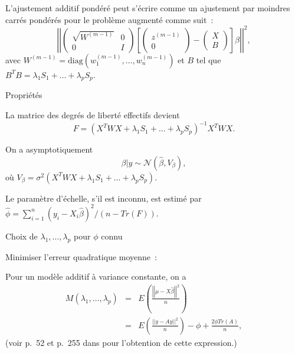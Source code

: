 \documentclass{BeamerTemplate}
\begin{document}
\begin{refsection}
\begin{frame}{}
L'ajustement additif pondéré peut s'écrire comme un ajustement par moindres carrés pondérés pour le problème augmenté comme suit~:
$$\left|\left|
\left(\begin{array}{cc}
\sqrt{W^{(m-1)}} & 0 \\
0 & I 
\end{array} \right) 
\left[
\left(\begin{array}{c}
z^{(m-1)} \\
0
\end{array} \right) -
\left(\begin{array}{c}
X \\
B
\end{array} \right) \right]\beta
\right|\right|^2,
$$
avec $W^{(m-1)} = \mbox{diag}(w_1^{(m-1)}, \ldots,w_n^{(m-1)})$ et $B$ tel que $B^T B = \lambda_1 S_1 + \ldots + \lambda_p S_p.$

\end{frame}

\begin{frame}{Propriétés}

La matrice des degrés de liberté effectifs devient
$$F = (X^T  WX + \lambda_1 S_1 + \ldots + \lambda_p S_p)^{-1} X^T W X .$$

\bigskip
On a asymptotiquement
$$ \beta | y \sim {\mathcal N}(\hat{\beta}, V_{\beta}),$$
où $V_{\beta} = \sigma^2 (X^T W X + \lambda_1 S_1 + \ldots + \lambda_p S_p)$.

\bigskip
Le paramètre d'échelle, s'il est inconnu, est estimé par
$\hat{\phi} = \sum_{i=1}^n (y_i - X_i \hat{\beta})^2/ (n - Tr(F))$. 

\end{frame}


\begin{frame}{Choix de $\lambda_1,\ldots,\lambda_p$ pour $\phi$ connu}

Minimiser l'erreur quadratique moyenne~:

\bigskip
Pour un modèle additif à variance constante, on a
\begin{eqnarray*}
M(\lambda_1,\ldots,\lambda_p) & = &  E \left( \frac{ \left|\left| \mu - X \hat{\beta}  \right|\right|^2}{n} \right) \\
& = & E \left( \frac{ \left|\left| y - A y  \right|\right|^2}{n} \right) - \phi + \frac{2 \phi Tr(A)}{n},  
\end{eqnarray*}
(voir p.~52 et p.~255 dans  pour l'obtention de cette expression.)


\end{frame}
\end{refsection}
\end{document}
